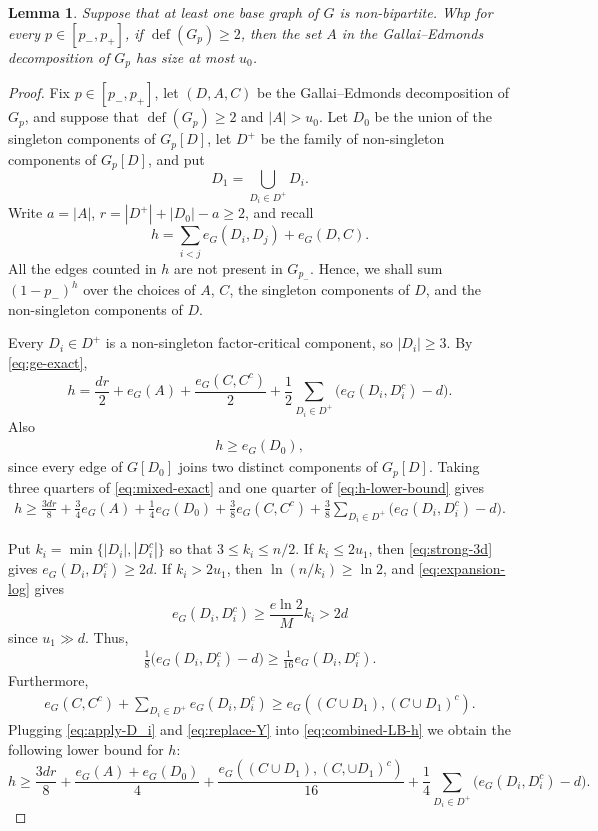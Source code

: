 \documentclass[10pt,a4paper]{article}
\newtheorem{lemma}[thm]{Lemma}
\newcommand{\defi}{\operatorname{def}}
\begin{document}
\begin{lemma}\label{lem:nonbipartite-ge}
Suppose that at least one base graph of $G$ is non-bipartite.
Whp for every $p\in[p_-,p_+]$, if $\defi(G_p)\ge2$, then the set $A$ in the Gallai--Edmonds decomposition of $G_p$ has size at most $u_0$.
\end{lemma}
\begin{proof}
Fix $p\in[p_-,p_+]$, let $(D,A,C)$ be the Gallai--Edmonds decomposition of $G_p$, and suppose that $\defi(G_p)\ge2$ and $|A|>u_0$.
Let $D_0$ be the union of the singleton components of $G_p[D]$, let $D^+$ be the family of non-singleton components of $G_p[D]$, and put
\[
 D_1=\bigcup_{D_i \in D^+} D_i.
\]
Write $a=|A|$, $r=|D^+|+|D_0|-a\ge2$, and recall
\[
 h=\sum_{i<j}e_G(D_i,D_j)+e_G(D,C).
\]
All the edges counted in $h$ are not present in $G_{p_-}$.
Hence, we shall sum $(1-p_-)^h$ over the choices of $A$, $C$, the singleton components of $D$, and the non-singleton components of $D$.

Every $D_i\in D^+$ is a non-singleton factor-critical component, so $|D_i|\ge3$.
By \eqref{eq:ge-exact},
\begin{equation}\label{eq:mixed-exact}
 h=\frac{dr}{2}+e_G(A)+\frac{e_G(C, C^c)}{2}
   +\frac{1}{2}\sum_{D_i\in D^+}\bigl(e_G(D_i, D_i^c)-d\bigr).
\end{equation}
Also 
\begin{align} \label{eq:h-lower-bound}
    h\ge e_G(D_0),
\end{align}
since every edge of $G[D_0]$ joins two distinct components of $G_p[D]$.
Taking three quarters of \eqref{eq:mixed-exact} and one quarter of \eqref{eq:h-lower-bound} gives
\begin{align} \label{eq:combined-LB-h}
     h\ge\frac{3dr}{8}+\frac34e_G(A)+\frac14e_G(D_0)  +\frac38 e_G(C, C^c)
 +\frac38\sum_{D_i\in D^+}\bigl(e_G(D_i, D_i^c)-d\bigr).
\end{align}

Put $k_i=\min\{|D_i|,|D_i^c|\}$ so that $3\le k_i\le n/2$.
If $k_i\le2u_1$, then \eqref{eq:strong-3d} gives $e_G(D_i, D_i^c)\ge2d$.
If $k_i>2u_1$, then $\ln(n/k_i)\ge\ln 2$, and \eqref{eq:expansion-log} gives
\[
 e_G(D_i, D_i^c)\ge\frac{e\ln 2}{M}k_i>2d
\]
since $u_1\gg d$. Thus,
\begin{align} \label{eq:apply-D_i}
    \frac18\bigl(e_G(D_i, D_i^c)-d\bigr)\ge\frac1{16}e_G(D_i, D_i^c).
\end{align}
Furthermore, 
 \begin{align} \label{eq:replace-Y}
     e_G(C, C^c)+\sum_{D_i\in D^+}e_G(D_i, D_i^c) \geq e_G((C \cup D_1), (C \cup D_1)^c).
 \end{align}
Plugging \eqref{eq:apply-D_i} and \eqref{eq:replace-Y} into \eqref{eq:combined-LB-h} we obtain the following lower bound for $h$:
\begin{equation}\label{eq:mixed-master}
 h\ge\frac{3dr}{8}
 +\frac{e_G(A)+e_G(D_0)}4
 +\frac{e_G((C \cup D_1), (C, \cup D_1)^c)}{16}
 +\frac14\sum_{D_i \in D^+}\bigl(e_G(D_i, D_i^c)-d\bigr).
\end{equation}


\end{proof}
\end{document}
